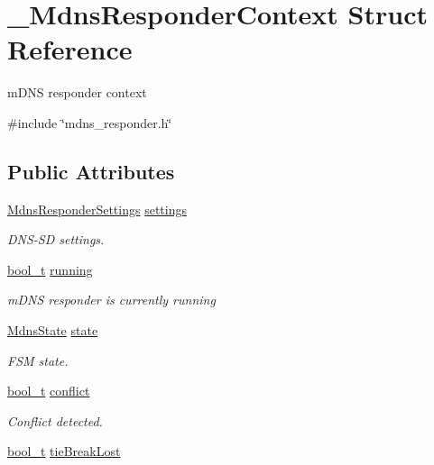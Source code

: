 \hypertarget{struct__MdnsResponderContext}{}\section{\+\_\+\+Mdns\+Responder\+Context Struct Reference}
\label{struct__MdnsResponderContext}


m\+D\+NS responder context  




{\ttfamily \#include \char`\"{}mdns\+\_\+responder.\+h\char`\"{}}

\subsection*{Public Attributes}
\begin{DoxyCompactItemize}
\item 
\hyperlink{structMdnsResponderSettings}{Mdns\+Responder\+Settings} \hyperlink{struct__MdnsResponderContext_a6774be0aaa58cf78c36e6f43f3f7a541}{settings}
\begin{DoxyCompactList}\small\item\em D\+N\+S-\/\+SD settings. \end{DoxyCompactList}\item 
\hyperlink{compiler__port_8h_a812d16e5494522586b3784e55d479912}{bool\+\_\+t} \hyperlink{struct__MdnsResponderContext_a306b14efeb5bf1e2bbe5c4c52e872519}{running}
\begin{DoxyCompactList}\small\item\em m\+D\+NS responder is currently running \end{DoxyCompactList}\item 
\hyperlink{mdns__responder_8h_a96ee67ecc8252ba576e72c97cd8f7fd3}{Mdns\+State} \hyperlink{struct__MdnsResponderContext_ad92f6902b160264bf0ad8008065bc17c}{state}
\begin{DoxyCompactList}\small\item\em F\+SM state. \end{DoxyCompactList}\item 
\hyperlink{compiler__port_8h_a812d16e5494522586b3784e55d479912}{bool\+\_\+t} \hyperlink{struct__MdnsResponderContext_a1dc6910f8d96e700d0ca5a040410d0bd}{conflict}
\begin{DoxyCompactList}\small\item\em Conflict detected. \end{DoxyCompactList}\item 
\hyperlink{compiler__port_8h_a812d16e5494522586b3784e55d479912}{bool\+\_\+t} \hyperlink{struct__MdnsResponderContext_abc3c2d37ce14867973548b15ec0a59ab}{tie\+Break\+Lost}

\end{DoxyCompactItemize}
